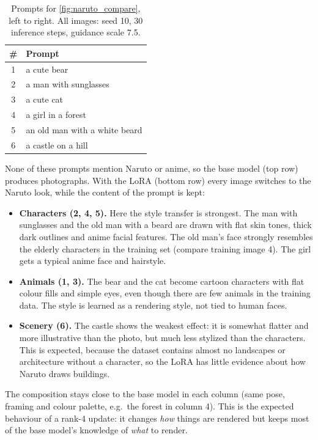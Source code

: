 \documentclass[a4paper]{article} %
\begin{document}
\begin{table}[H]
\centering
\caption{Prompts for \autoref{fig:naruto_compare}, left to right. All images: seed 10, 30
inference steps, guidance scale 7.5.}
\label{tab:naruto_prompts}
\begin{tabular}{cl}
\toprule
\# & Prompt \\
\midrule
1 & a cute bear \\
2 & a man with sunglasses \\
3 & a cute cat \\
4 & a girl in a forest \\
5 & an old man with a white beard \\
6 & a castle on a hill \\
\bottomrule
\end{tabular}
\end{table}

None of these prompts mention Naruto or anime, so the base model (top row) produces photographs.
With the LoRA (bottom row) every image switches to the Naruto look, while the content of the prompt
is kept:
\begin{itemize}
    \item \textbf{Characters (2, 4, 5).} Here the style transfer is strongest. The man with sunglasses
    and the old man with a beard are drawn with flat skin tones, thick dark outlines and anime facial
    features. The old man's face strongly resembles the elderly characters in the training set
    (compare training image 4). The girl gets a typical anime face and hairstyle.
    \item \textbf{Animals (1, 3).} The bear and the cat become cartoon characters with flat colour
    fills and simple eyes, even though there are few animals in the training data. The style is
    learned as a rendering style, not tied to human faces.
    \item \textbf{Scenery (6).} The castle shows the weakest effect: it is somewhat flatter and more
    illustrative than the photo, but much less stylized than the characters. This is expected,
    because the dataset contains almost no landscapes or architecture without a character, so the
    LoRA has little evidence about how Naruto draws buildings.
\end{itemize}
The composition stays close to the base model in each column (same pose, framing and colour
palette, e.g.\ the forest in column 4). This is the expected behaviour of a rank-4 update: it changes
\emph{how} things are rendered but keeps most of the base model's knowledge of \emph{what} to
render.
\end{document}
